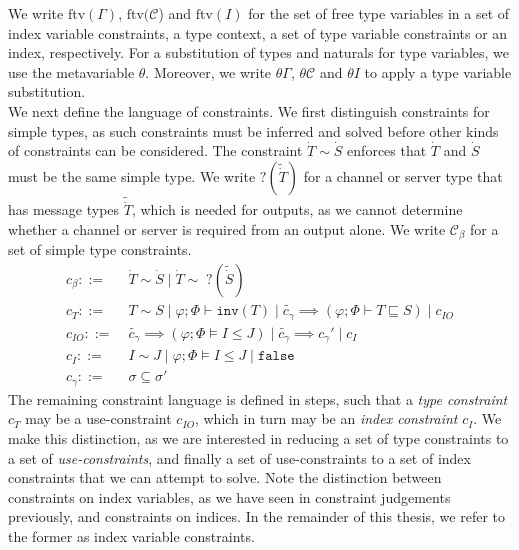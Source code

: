 We write $\text{ftv}(\Gamma)$, $\text{ftv}(\mathcal{C}$) and $\text{ftv}(I)$ for the set of free type variables in a set of index variable constraints, a type context, a set of type variable constraints or an index, respectively. For a substitution of types and naturals for type variables, we use the metavariable $\theta$. Moreover, we write $\theta\Gamma$, $\theta\mathcal{C}$ and $\theta I$ to apply a type variable substitution.\\ 

We next define the language of constraints. We first distinguish constraints for simple types, as such constraints must be inferred and solved before other kinds of constraints can be considered. The constraint $\dot{T} \sim \dot{S}$ enforces that $\dot{T}$ and $\dot{S}$ must be the same simple type. We write $?(\widetilde{\dot{T}})$ for a channel or server type that has message types $\widetilde{\dot{T}}$, which is needed for outputs, as we cannot determine whether a channel or server is required from an output alone. We write $\mathcal{C}_\beta$ for a set of simple type constraints.
%
\begin{align*}
    c_\beta ::=&\; \dot{T} \sim \dot{S} \mid \dot{T} \sim\; ?(\widetilde{\dot{S}}) \\%
    c_T ::=&\; T \sim S \mid \varphi;\Phi\vdash \texttt{inv}(T) \mid \widetilde{c_\gamma} \implies (\varphi;\Phi\vdash T \sqsubseteq S) \mid c_{IO} \\
    c_{IO} ::=&\; \widetilde{c_\gamma} \implies (\varphi;\Phi\vDash I \leq J) \mid \widetilde{c_\gamma} \implies c_\gamma' \mid c_I\\
    c_I ::=&\; I \sim J \mid \varphi;\Phi\vDash I \leq J \mid \texttt{false}\\
    c_\gamma ::=&\; \sigma \subseteq \sigma' 
\end{align*}
%
The remaining constraint language is defined in steps, such that a \textit{type constraint} $c_T$ may be a use-constraint $c_{IO}$, which in turn may be an \textit{index constraint} $c_I$. We make this distinction, as we are interested in reducing a set of type constraints to a set of \textit{use-constraints}, and finally a set of use-constraints to a set of index constraints that we can attempt to solve. Note the distinction between constraints on index variables, as we have seen in constraint judgements previously, and constraints on indices. In the remainder of this thesis, we refer to the former as index variable constraints.\\

